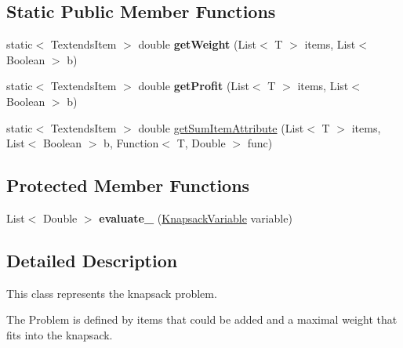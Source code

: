 \subsection*{Static Public Member Functions}
\begin{DoxyCompactItemize}
\item 
\hypertarget{classcom_1_1msu_1_1knp_1_1KnapsackProblem_a001af3c71b70b741fbb9e97be55b0771}{static$<$ Textends\-Item $>$ double {\bfseries get\-Weight} (List$<$ T $>$ items, List$<$ Boolean $>$ b)}\label{classcom_1_1msu_1_1knp_1_1KnapsackProblem_a001af3c71b70b741fbb9e97be55b0771}

\item 
\hypertarget{classcom_1_1msu_1_1knp_1_1KnapsackProblem_a76140b794fa226f6b3cd945bbf717814}{static$<$ Textends\-Item $>$ double {\bfseries get\-Profit} (List$<$ T $>$ items, List$<$ Boolean $>$ b)}\label{classcom_1_1msu_1_1knp_1_1KnapsackProblem_a76140b794fa226f6b3cd945bbf717814}

\item 
static$<$ Textends\-Item $>$ double \hyperlink{classcom_1_1msu_1_1knp_1_1KnapsackProblem_ae82777f42a9c6b80eca15ebc2864cd86}{get\-Sum\-Item\-Attribute} (List$<$ T $>$ items, List$<$ Boolean $>$ b, Function$<$ T, Double $>$ func)
\end{DoxyCompactItemize}
\subsection*{Protected Member Functions}
\begin{DoxyCompactItemize}
\item 
\hypertarget{classcom_1_1msu_1_1knp_1_1KnapsackProblem_adc1b4a49bcd78ca332d993609ec3f0ab}{List$<$ Double $>$ {\bfseries evaluate\-\_\-} (\hyperlink{classcom_1_1msu_1_1knp_1_1KnapsackVariable}{Knapsack\-Variable} variable)}\label{classcom_1_1msu_1_1knp_1_1KnapsackProblem_adc1b4a49bcd78ca332d993609ec3f0ab}

\end{DoxyCompactItemize}


\subsection{Detailed Description}
This class represents the knapsack problem.

The Problem is defined by items that could be added and a maximal weight that fits into the knapsack. 

